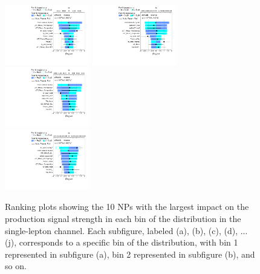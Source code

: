 \begin{figure}[ht]
  \includegraphics[width=0.33\textwidth]{figures/diff_xsec/ljet_tty_prod_mu_blinded/Ranking/tty1l_pt_all_syst/Ranking_tty_pt_Bin_007_mu.pdf}%
  \includegraphics[width=0.33\textwidth]{figures/diff_xsec/ljet_tty_prod_mu_blinded/Ranking/tty1l_pt_all_syst/Ranking_tty_pt_Bin_008_mu.pdf}%
  \includegraphics[width=0.33\textwidth]{figures/diff_xsec/ljet_tty_prod_mu_blinded/Ranking/tty1l_pt_all_syst/Ranking_tty_pt_Bin_009_mu.pdf}\\
  \includegraphics[width=0.33\textwidth]{figures/diff_xsec/ljet_tty_prod_mu_blinded/Ranking/tty1l_pt_all_syst/Ranking_tty_pt_Bin_010_mu.pdf}%
  \caption{Ranking plots showing the 10 NPs with the largest impact on the \tty production signal strength in each bin of the \ptgamma distribution in the single-lepton channel. Each subfigure, labeled (a), (b), (c), (d), ... (j), corresponds to a specific bin of the \ptgamma distribution, with bin 1 represented in subfigure (a), bin 2 represented in subfigure (b), and so on.}
  \label{fig:ranking_ljet_prod}
\end{figure}
\FloatBarrier



